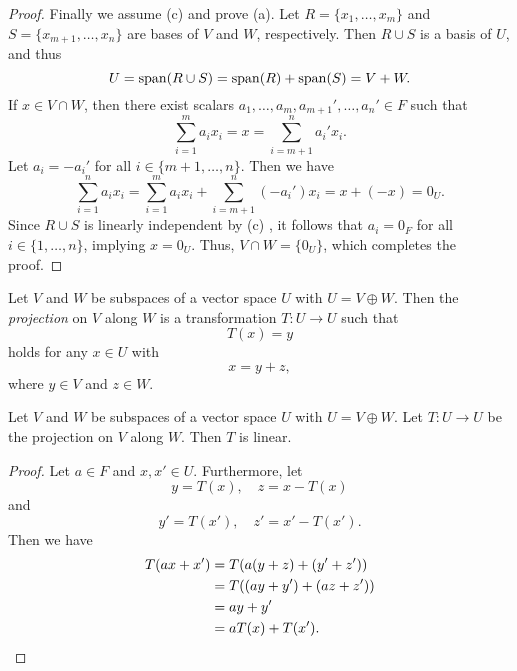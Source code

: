 \begin{proof}
  Finally we assume (c) and prove (a).
  Let $R = \{x_1, \dots, x_m\}$ and $S = \{x_{m+1}, \dots, x_n\}$ are bases of
  $V$ and $W$, respectively.
  Then $R \cup S$ is a basis of $U$, and thus
  \begin{equation*}
    U = \operatorname{span}(R \cup S) = \operatorname{span}(R) + \operatorname{span}(S) = V + W.
  \end{equation*}
  If $x \in V \cap W$, then there exist scalars $a_1, \dots, a_m, a_{m+1}',
  \dots, a_n' \in F$ such that
  \begin{equation*}
    \sum_{i=1}^m a_ix_i = x = \sum_{i=m+1}^n a_i'x_i.
  \end{equation*}
  Let $a_i = -a_i'$ for all $i \in \{m+1, \dots, n\}$.
  Then we have
  \begin{equation*}
    \sum_{i=1}^n a_ix_i
    = \sum_{i=1}^m a_ix_i + \sum_{i=m+1}^n (-a_i')x_i
    = x + (-x)
    = 0_U.
  \end{equation*}
  Since $R \cup S$ is linearly independent by (c) , it follows that $a_i = 0_F$
  for all $i \in \{1, \dots, n\}$, implying $x = 0_U$.
  Thus, $V \cap W = \{0_U\}$, which completes the proof.
\end{proof}

\begin{definition}
  \label{def:projection}
  Let $V$ and $W$ be subspaces of a vector space $U$ with $U = V \oplus W$.
  Then the \emph{projection} on $V$ along $W$ is a transformation $T: U \to U$
  such that
  \begin{equation*}
    T(x) = y
  \end{equation*}
  holds for any $x \in U$ with
  \begin{equation*}
    x = y + z,
  \end{equation*}
  where $y \in V$ and $z \in W$.
\end{definition}

\begin{theorem}
  Let $V$ and $W$ be subspaces of a vector space $U$ with $U = V \oplus W$.
  Let $T: U \to U$ be the projection on $V$ along $W$.
  Then $T$ is linear.
\end{theorem}
\begin{proof}
  Let $a \in F$ and $x, x' \in U$.
  Furthermore, let
  \begin{equation*}
    y = T(x),
    \quad
    z = x - T(x)
  \end{equation*}
  and
  \begin{equation*}
    y' = T(x'),
    \quad
    z' = x' - T(x').
  \end{equation*}
  Then we have
  \begin{align*}
    T(ax + x')
    &= T(a(y + z) + (y' + z')) \\
    &= T((ay + y') + (az + z')) \\
    &= ay + y' \\
    &= aT(x) + T(x').
    \qedhere
  \end{align*}
\end{proof}

